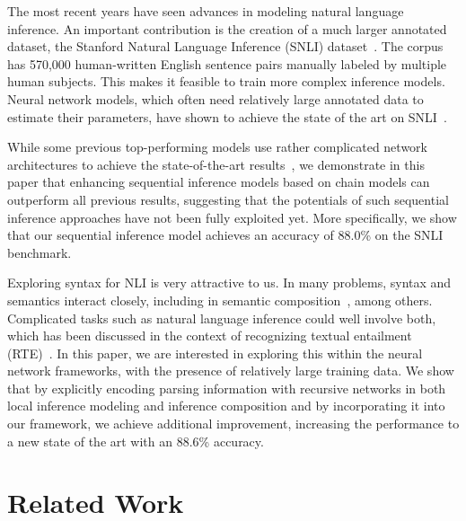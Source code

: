 \documentclass[11pt,a4paper]{article}
\begin{document}
The most recent years have seen advances in modeling natural language inference. An important contribution is the creation of a much larger annotated dataset, the Stanford Natural Language Inference (SNLI) dataset~\cite{Bowman:D15-1075}. The corpus has 570,000 human-written English sentence pairs manually labeled by multiple human subjects. This makes it feasible to train more complex inference models. Neural network models, which often need relatively large annotated data to estimate their parameters, have shown to achieve the state of the art on SNLI~\citep{Bowman:D15-1075,Bowman:P16-1139,DBLP:journals/corr/MunkhdalaiY16b,Parikh:D16-1244,Sha:C16-1270,DBLP:journals/corr/PariaADCP16}.

While some previous top-performing models use rather complicated network architectures to achieve the state-of-the-art results~\cite{DBLP:journals/corr/MunkhdalaiY16b}, we demonstrate in this paper that enhancing sequential inference models based on chain models can outperform all previous results, suggesting that the potentials of such sequential inference approaches have not been fully exploited yet. More specifically, we show that our sequential inference model achieves an accuracy of 88.0\% on the SNLI benchmark.

Exploring syntax for NLI is very attractive to us. In many problems, syntax and semantics interact closely, including in semantic composition~\cite{Partee:1995}, among others. Complicated tasks such as natural language inference could well involve both, which has been discussed in the context of recognizing textual entailment (RTE)~\citep{Mehdad:N10-1146,Ferrone:C14-1068}. 
In this paper, we are interested in exploring this within the neural network frameworks, with the presence of relatively large training data. We show that by explicitly encoding parsing information with recursive networks in both local inference modeling and inference composition and by incorporating it into our framework, we achieve additional improvement, increasing the performance to a new state of the art with an 88.6\% accuracy.

\section{Related Work}
\label{sec:related}
\end{document}
